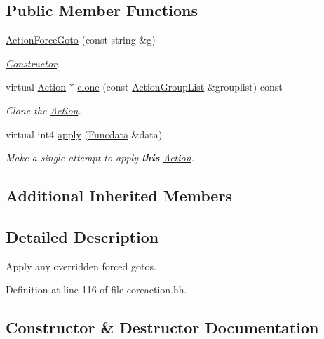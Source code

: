 \subsection*{Public Member Functions}
\begin{DoxyCompactItemize}
\item 
\mbox{\hyperlink{class_action_force_goto_a0e90d0ee175cf04cd02a21fd6e027fbf}{Action\+Force\+Goto}} (const string \&g)
\begin{DoxyCompactList}\small\item\em \mbox{\hyperlink{class_constructor}{Constructor}}. \end{DoxyCompactList}\item 
virtual \mbox{\hyperlink{class_action}{Action}} $\ast$ \mbox{\hyperlink{class_action_force_goto_ab44cdae35f8c6fd4051b0ddb435fee9a}{clone}} (const \mbox{\hyperlink{class_action_group_list}{Action\+Group\+List}} \&grouplist) const
\begin{DoxyCompactList}\small\item\em Clone the \mbox{\hyperlink{class_action}{Action}}. \end{DoxyCompactList}\item 
virtual int4 \mbox{\hyperlink{class_action_force_goto_af7842a93290323e3bb92dcd62c9a66cc}{apply}} (\mbox{\hyperlink{class_funcdata}{Funcdata}} \&data)
\begin{DoxyCompactList}\small\item\em Make a single attempt to apply {\bfseries{this}} \mbox{\hyperlink{class_action}{Action}}. \end{DoxyCompactList}\end{DoxyCompactItemize}
\subsection*{Additional Inherited Members}


\subsection{Detailed Description}
Apply any overridden forced gotos. 

Definition at line 116 of file coreaction.\+hh.



\subsection{Constructor \& Destructor Documentation}
\mbox{\label{class_action_force_goto_a0e90d0ee175cf04cd02a21fd6e027fbf}} 
